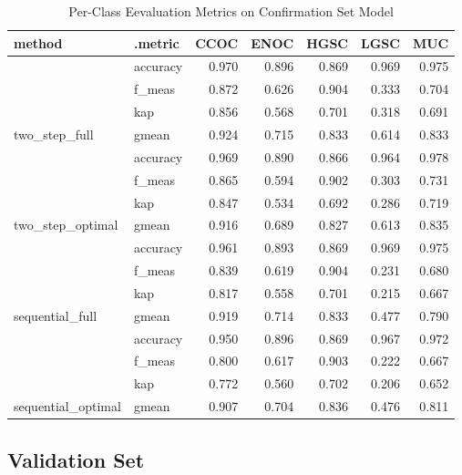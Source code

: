 \documentclass[
]{report}
\begin{document}
\begin{table}

\caption{\label{tab:conf-eval-per-class}Per-Class Eevaluation Metrics on Confirmation Set Model}
\centering
\begin{tabular}[t]{l|l|r|r|r|r|r}
\hline
method & .metric & CCOC & ENOC & HGSC & LGSC & MUC\\
\hline
 & accuracy & 0.970 & 0.896 & 0.869 & 0.969 & 0.975\\
\cline{2-7}
 & f\_meas & 0.872 & 0.626 & 0.904 & 0.333 & 0.704\\
\cline{2-7}
 & kap & 0.856 & 0.568 & 0.701 & 0.318 & 0.691\\
\cline{2-7}
\multirow{-4}{*}{\raggedright\arraybackslash two\_step\_full} & gmean & 0.924 & 0.715 & 0.833 & 0.614 & 0.833\\
\cline{1-7}
 & accuracy & 0.969 & 0.890 & 0.866 & 0.964 & 0.978\\
\cline{2-7}
 & f\_meas & 0.865 & 0.594 & 0.902 & 0.303 & 0.731\\
\cline{2-7}
 & kap & 0.847 & 0.534 & 0.692 & 0.286 & 0.719\\
\cline{2-7}
\multirow{-4}{*}{\raggedright\arraybackslash two\_step\_optimal} & gmean & 0.916 & 0.689 & 0.827 & 0.613 & 0.835\\
\cline{1-7}
 & accuracy & 0.961 & 0.893 & 0.869 & 0.969 & 0.975\\
\cline{2-7}
 & f\_meas & 0.839 & 0.619 & 0.904 & 0.231 & 0.680\\
\cline{2-7}
 & kap & 0.817 & 0.558 & 0.701 & 0.215 & 0.667\\
\cline{2-7}
\multirow{-4}{*}{\raggedright\arraybackslash sequential\_full} & gmean & 0.919 & 0.714 & 0.833 & 0.477 & 0.790\\
\cline{1-7}
 & accuracy & 0.950 & 0.896 & 0.869 & 0.967 & 0.972\\
\cline{2-7}
 & f\_meas & 0.800 & 0.617 & 0.903 & 0.222 & 0.667\\
\cline{2-7}
 & kap & 0.772 & 0.560 & 0.702 & 0.206 & 0.652\\
\cline{2-7}
\multirow{-4}{*}{\raggedright\arraybackslash sequential\_optimal} & gmean & 0.907 & 0.704 & 0.836 & 0.476 & 0.811\\
\hline
\end{tabular}
\end{table}

\hypertarget{validation-set}{%
\subsection{Validation Set}\label{validation-set}}
\end{document}
